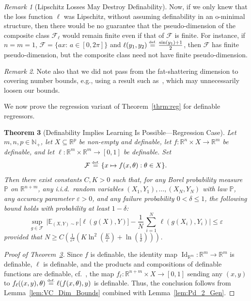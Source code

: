 \documentclass{article}
\newcommand{\eqdef}{\ensuremath{\stackrel{\mbox{\upshape\tiny def.}}{=}}}
\theoremstyle{plain}
\newtheorem{theorem}{Theorem}[section]
\theoremstyle{definition}
\theoremstyle{remark}
\newtheorem{remark}[theorem]{Remark}
\newcommand{\calF}{\mathcal{F}}
\theoremstyle{plain}
\numberwithin{thm}{section}
\theoremstyle{definition}
\numberwithin{equation}{section}
\begin{document}
\begin{remark}[Lipschitz Losses May Destroy Definability]
Now, if we only knew that the loss function $\ell$ was Lipschitz, without assuming definability in an o-minimal structure, then there would be no guarantee that the pseudo-dimension of the composite class $\calF_{\ell}$ would remain finite even if that of $\calF$ is finite.  For instance, if $n=m=1$, $\calF=\{ax:\, a\in [0,2\pi]\}$ and $\ell(y_1,y_2)\eqdef \tfrac{\sin(y_1)+1}{2}$, then $\calF$ has finite pseudo-dimension, but the composite class need not have finite pseudo-dimension.   
\end{remark}
\begin{remark}
Note also that we did not pass from the fat-shattering dimension to covering number bounds, e.g., using a result such as~\cite[Theorem 2]{BartlettKulkarniPosner_CoveringFatShattering_1997}, which may unnecessarily loosen our bounds.
\end{remark}
We now prove the regression variant of Theorem~\ref{thrm:reg} for definable regressors.
\begin{theorem}[Definability Implies Learning Is Possible---Regression Case]
\label{thrm:definability__2__generalizability___regression}
Let $m,n,p\in \mathbb{N}_+$, let $X\subseteq \mathbb{R}^p$ be non-empty and definable,
let $f:\mathbb{R}^n\times X\to \mathbb{R}^m$ be definable, and let $\ell:\mathbb{R}^m\times \mathbb{R}^m\to [0,1]$ be definable.
Set
\[
\calF\eqdef\{x\mapsto f(x,\theta):\theta\in X\}.
\]
Then there exist constants $C,K>0$ such that, for any Borel probability measure $\mathbb{P}$ on $\mathbb{R}^{n+m}$, any i.i.d.\ random variables
$(X_1,Y_1),\dots,(X_N,Y_N)$ with law $\mathbb{P}$, any accuracy parameter $\varepsilon>0$, and any failure probability $0<\delta \le 1$, the following bound holds with probability at least $1-\delta$:
\hfill\\
\noindent
\[
\sup_{g\in \calF}\,
\biggl|
    \mathbb{E}_{(X,Y)\sim \mathbb{P}}\big[
        \ell(g(X),Y)
    \big]
    -
    \frac1{N}\,\sum_{i=1}^N\,
        \ell(g(X_i),Y_i)
\biggr|
\le
\varepsilon
\]
provided that
$
N
\ge
    C\left( \frac{1}{\varepsilon^2} \left(
        K
        \ln^2\left(\frac{
                K
            }{\varepsilon}\right) + \ln\left(\frac{1}{\delta}\right) \right) \right)
$.
\end{theorem}
\begin{proof}[{Proof of Theorem~\ref{thrm:definability__2__generalizability___regression}}]
Since $f$ is definable, the identity map $\operatorname{Id}_{\mathbb{R}^m}:\mathbb{R}^m\to \mathbb{R}^m$ is definable, $\ell$ is definable, and the products and compositions of definable functions are definable, cf.~\citep[Section 1.3]{coste1999introduction},
the map
$
f_{\ell}:\mathbb{R}^{n+m}\times X\to [0,1]
$ sending any $(x,y)$ to $f_{\ell}((x,y),\theta)\eqdef \ell(f(x,\theta),y)$ 
is definable.
Thus, the conclusion follows from Lemma~\ref{lem:VC_Dim_Bounds} combined with Lemma~\ref{lem:Pd_2_Gen}.
\end{proof}
\end{document}
